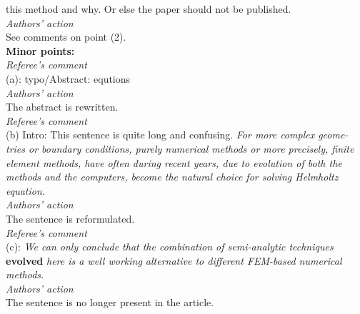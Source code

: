 \documentclass[a4paper,12pt]{article}%
\begin{document}
this method and why.
Or else the paper should not be published.\\
{\it Authors' action}\\
See comments on point (2).\\
\newline
\textbf{Minor points:}\\
{\it Referee's comment}\\
(a): typo/Abstract: equtions\\
{\it Authors' action}\\
The abstract is rewritten.\\
\newline
{\it Referee's comment}\\
(b) Intro: This sentence is quite long and confusing. \textit{For more
  complex geome- tries or boundary conditions, purely numerical
  methods or more precisely, finite element methods, have often during
  recent years, due to evolution of both the methods and the
  computers, become the natural choice for solving Helmholtz equation.}\\
{\it Authors' action}\\
The sentence is reformulated.\\
\newline
{\it Referee's comment}\\
(c): \textit{We can only conclude that the combination of
  semi-analytic techniques} \textbf{evolved}
\textit{here is a well working alternative to different FEM-based numerical methods.}\\
{\it Authors' action}\\
The sentence is no longer present in the article.
\end{document}
